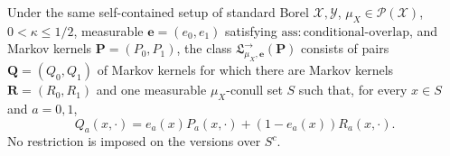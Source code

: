 Under the same self-contained setup of standard Borel \(\mathcal X,\mathcal Y\), \(\mu_X\in\mathcal P(\mathcal X)\), \(0<\kappa\le1/2\), measurable \(\boldsymbol e=(e_0,e_1)\) satisfying \(\mathrm{ass:conditional\text{-}overlap}\), and Markov kernels \(\boldsymbol P=(P_0,P_1)\), the class \(\mathfrak L^{\to}_{\mu_X,\boldsymbol e}(\boldsymbol P)\) consists of pairs \(\boldsymbol Q=(Q_0,Q_1)\) of Markov kernels for which there are Markov kernels \(\boldsymbol R=(R_0,R_1)\) and one measurable \(\mu_X\)-conull set \(S\) such that, for every \(x\in S\) and \(a=0,1\),
\[
 Q_a(x,\cdot)=e_a(x)P_a(x,\cdot)+(1-e_a(x))R_a(x,\cdot).
\]
No restriction is imposed on the versions over \(S^c\).